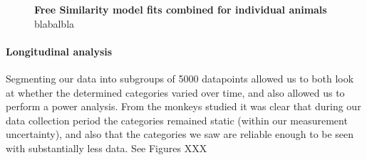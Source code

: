 \begin{figure}
    \centering
    \begin{subfigure}[b]{0.49\textwidth}
         \centering
         \caption{}
         
         \label{fig:SimilarityMatrixPollux}
    \end{subfigure}
    \hfill
    \begin{subfigure}[b]{0.49\textwidth}
         \centering
         \caption{}
             
         \label{fig:SimilarityMatrixCastor}
    \end{subfigure}
    
    \begin{subfigure}[b]{0.49\textwidth}
         \centering
         \caption{}
             
         \label{fig:SimilarityMatrixBuster}
     \end{subfigure}
     \hfill
     \begin{subfigure}[b]{0.49\textwidth}
         \centering
         \caption{}
             
         \label{fig:SimilarityMatrixMorty}
     \end{subfigure}
        \caption{\textbf{Free Similarity model fits combined for individual animals} blabalbla}
        \label{fig:SimilarityMatrixIndividual}
\end{figure}


\paragraph{Longitudinal analysis}

Segmenting our data into subgroups of 5000 datapoints allowed us to both look at whether the determined categories varied over time, and also allowed us to perform a power analysis. From the monkeys studied it was clear that during our data collection period the categories remained static (within our measurement uncertainty), and also that the categories we saw are reliable enough to be seen with substantially less data. See Figures XXX %